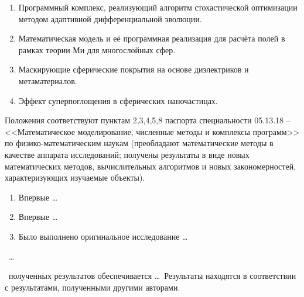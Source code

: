 \begin{enumerate}
  \item Программный комплекс, реализующий алгоритм стохастической
    оптимизации методом адаптивной дифференциальной эволюции.
  \item Математическая модель и её программная реализация для расчёта
    полей в рамках теории Ми для многослойных сфер.
  \item Маскирующие сферические покрытия на основе диэлектриков и метаматериалов.
  \item Эффект суперпоглощения в сферических наночастицах.
\end{enumerate}
Положения соответствуют пунктам 2,3,4,5,8 паспорта специальности
05.13.18 -- <<Математическое моделирование, численные методы и
комплексы программ>> по физико-математическим наукам (преобладают
математические методы в качестве аппарата исследований; получены
результаты в виде новых математических методов, вычислительных
алгоритмов и новых закономерностей, характеризующих изучаемые
объекты).

\novelty
\begin{enumerate}
  \item Впервые \ldots
  \item Впервые \ldots
  \item Было выполнено оригинальное исследование \ldots
\end{enumerate}

\influence\ \ldots

\reliability\ полученных результатов обеспечивается \ldots \ Результаты находятся в соответствии с результатами, полученными другими авторами.

